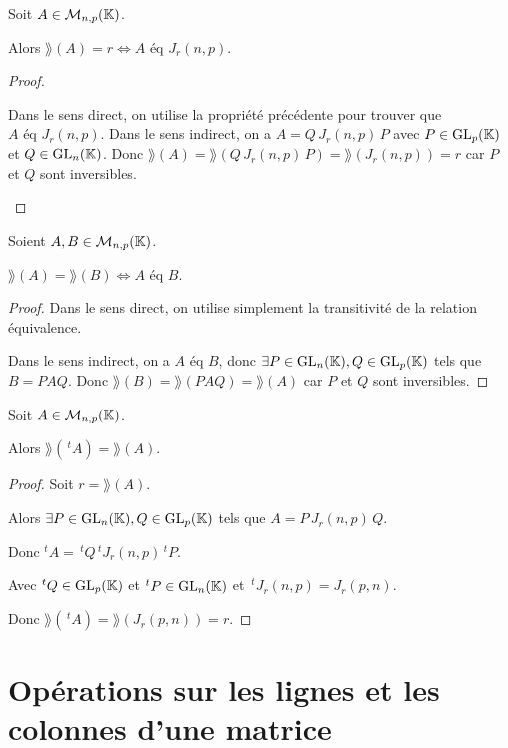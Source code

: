 \documentclass[12pt, a4paper]{report}
\begin{document}
\begin{consequence}
    Soit $A \in \mathcal M_{n,p}(\mathbb{K})$.

    Alors $\rang(A) = r \iff A \text{ éq } J_r(n,p)$.
\end{consequence}

\begin{proof}
    \begin{outline}
        \1 Dans le sens direct, on utilise la propriété précédente pour trouver que $A \text{ éq } J_r(n,p)$.
        \1 Dans le sens indirect, on a $A = Q\,J_r(n,p)\,P$ avec $P \in \mathrm{GL}_p(\mathbb{K})$ et $Q \in \mathrm{GL}_n(\mathbb{K})$. Donc $\rang(A) = \rang(Q\,J_r(n,p)\,P) = \rang(J_r(n,p)) = r$ car $P$ et $Q$ sont inversibles.
    \end{outline}
\end{proof}

\begin{consequence}
    Soient $A,B \in \mathcal M_{n,p}(\mathbb{K})$.

    $\rang(A) = \rang(B) \iff A \text{ éq } B$.
\end{consequence}

\begin{proof}
    Dans le sens direct, on utilise simplement la transitivité de la relation équivalence.

    Dans le sens indirect, on a $A \text{ éq } B$, donc $\exists P \in \mathrm{GL}_n(\mathbb{K}), Q \in \mathrm{GL}_p(\mathbb{K})$ tels que $B = PAQ$. Donc $\rang(B) = \rang(PAQ) = \rang(A)$ car $P$ et $Q$ sont inversibles.
\end{proof}

\begin{property}
    Soit $A \in \mathcal M_{n,p}(\mathbb{K})$.

    Alors $\rang(\,^tA) = \rang(A)$.
\end{property}

\begin{proof}
    Soit $r = \rang(A)$.

    Alors $\exists P \in \mathrm{GL}_n(\mathbb{K}), Q \in \mathrm{GL}_p(\mathbb{K})$ tels que $A = P\,J_r(n,p)\,Q$.

    Donc $^tA = \,{^tQ}\,{^tJ_r(n,p)}\,{^tP}$.

    Avec $^tQ \in \mathrm{GL}_p(\mathbb{K})$ et $^tP \in \mathrm{GL}_n(\mathbb{K})$ et $\,^tJ_r(n,p) = J_r(p,n)$.

    Donc $\rang(\,^tA) = \rang(J_r(p,n)) = r$.
\end{proof}

\chapter{Opérations sur les lignes et les colonnes d'une matrice}
\end{document}
